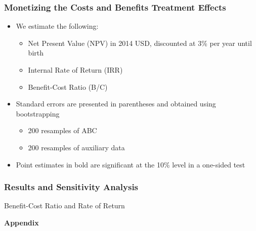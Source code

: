 \documentclass[static]{JJH-Beamer}
\newcommand{\backupbegin}{
   \newcounter{finalframe}
   \setcounter{finalframe}{\value{framenumber}}
}
\begin{document}

\begin{frame}
\frametitle{Monetizing the Costs and Benefits Treatment Effects}
\begin{itemize}
	\item We estimate the following:
	\begin{itemize} 
		\item Net Present Value (NPV) in 2014 USD, discounted at 3\% per year until birth
		\item Internal Rate of Return (IRR)
		\item Benefit-Cost Ratio (B/C) 
	\end{itemize}
	\item Standard errors are presented in parentheses and obtained using bootstrapping
	\begin{itemize}
		\item 200 resamples of ABC
		\item 200 resamples of auxiliary data
	\end{itemize}
	\item Point estimates in bold are significant at the 10\% level in a one-sided test 

\end{itemize}
\end{frame}

\begin{frame}
\frametitle{Results and Sensitivity Analysis}
\begin{center}
\begin{table}
	\caption{Benefit-Cost Ratio and Rate of Return} \label{tab:bcr_irr1}
	\scalebox{.45}{}
\end{table}
\end{center}
\end{frame}
\clearpage




\appendix
\backupbegin
\begin{frame}[noframenumbering]

\begin{block}{}
\begin{center}
\textbf{Appendix}
\end{center}
\end{block}

\end{frame}
\end{document}
